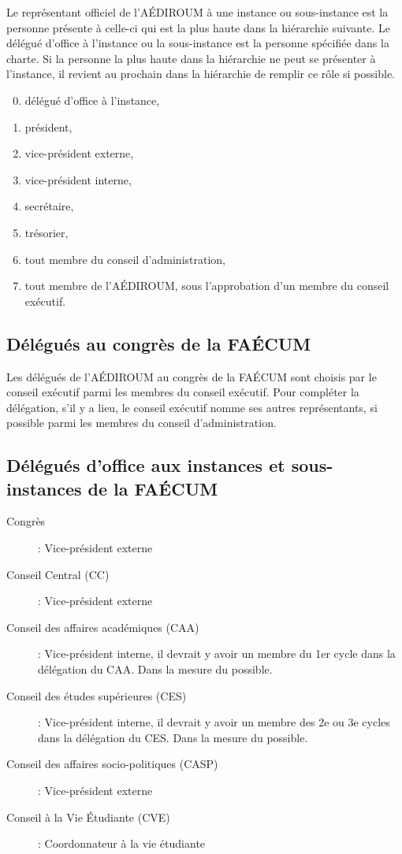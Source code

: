 \documentclass[12pt]{article}
\begin{document}
Le représentant officiel de l'AÉDIROUM à une instance ou sous-instance est la personne présente à celle-ci qui est la plus haute dans la hiérarchie suivante. Le délégué d’office à l’instance ou la sous-instance est la personne spécifiée dans la charte. Si la personne la plus haute
dans la hiérarchie ne peut se présenter à l’instance, il revient au prochain dans la
hiérarchie de remplir ce rôle si possible.
  \begin{enumerate}\setcounter{enumi}{-1}
  \item délégué d'office à l'instance,
  \item président,
  \item vice-président externe,
  \item vice-président interne,
  \item secrétaire,
  \item trésorier,
  \item tout membre du conseil d'administration,
  \item tout membre de l'AÉDIROUM, sous l'approbation d'un membre du conseil exécutif.
  \end{enumerate}

\subsection{Délégués au congrès de la FAÉCUM}

Les délégués de l'AÉDIROUM au congrès de la FAÉCUM sont choisis par le conseil exécutif parmi les membres du conseil exécutif. Pour compléter la délégation, s'il y a lieu, le conseil exécutif nomme ses autres représentants, si possible parmi les membres du conseil d'administration.

\subsection{Délégués d'office aux instances et sous-instances de la FAÉCUM}
\begin{description}
\item[Congrès] : Vice-président externe
\item[Conseil Central (CC)] : Vice-président externe
\item[Conseil des affaires académiques (CAA)] : Vice-président interne, il devrait y avoir un membre du 1er cycle dans la délégation du CAA. Dans la mesure du possible.
\item[Conseil des études supérieures (CES)] : Vice-président interne, il devrait y avoir un membre des 2e ou 3e cycles dans la délégation du CES. Dans la mesure du possible.
\item[Conseil des affaires socio-politiques (CASP)] : Vice-président externe
\item[Conseil à la Vie Étudiante (CVE)] : Coordonnateur à la vie étudiante
\end{description}
\end{document}
